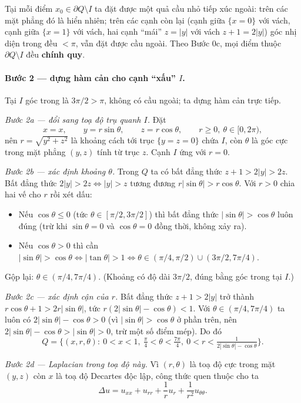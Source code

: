 Tại mỗi điểm $x_0\in\partial Q\setminus I$ ta đặt được một quả cầu nhỏ tiếp xúc ngoài: trên các mặt phẳng đó là hiển nhiên; trên các cạnh còn lại (cạnh giữa $\{x=0\}$ với vách, cạnh giữa $\{x=1\}$ với vách, hai cạnh ``mái'' $z=|y|$ với vách $z+1=2|y|$) góc nhị diện trong đều $<\pi$, vẫn đặt được cầu ngoài. Theo Bước 0c, mọi điểm thuộc $\partial Q\setminus I$ đều \textbf{chính quy}.

\paragraph{Bước 2 --- dựng hàm cản cho cạnh ``xấu'' $I$.}\leavevmode

Tại $I$ góc trong là $3\pi/2>\pi$, không có cầu ngoài; ta dựng hàm cản trực tiếp.

\emph{Bước 2a --- đổi sang toạ độ trụ quanh $I$.} Đặt
\[
  x=x,\qquad y=r\sin\theta,\qquad z=r\cos\theta,\qquad r\ge0,\ \theta\in[0,2\pi),
\]
nên $r=\sqrt{y^2+z^2}$ là khoảng cách tới trục $\{y=z=0\}$ chứa $I$, còn $\theta$ là góc cực trong mặt phẳng $(y,z)$ tính từ trục $z$. Cạnh $I$ ứng với $r=0$.

\emph{Bước 2b --- xác định khoảng $\theta$.} Trong $Q$ ta có bất đẳng thức $z+1>2|y|>2z$. Bất đẳng thức $2|y|>2z\iff|y|>z$ tương đương $r|\sin\theta|>r\cos\theta$. Với $r>0$ chia hai vế cho $r$ rồi xét dấu:
\begin{itemize}
  \item Nếu $\cos\theta\le0$ (tức $\theta\in[\pi/2,3\pi/2]$) thì bất đẳng thức $|\sin\theta|>\cos\theta$ luôn đúng (trừ khi $\sin\theta=0$ và $\cos\theta=0$ đồng thời, không xảy ra).
  \item Nếu $\cos\theta>0$ thì cần $|\sin\theta|>\cos\theta\iff|\tan\theta|>1\iff\theta\in(\pi/4,\pi/2)\cup(3\pi/2,7\pi/4)$.
\end{itemize}
Gộp lại: $\theta\in(\pi/4,7\pi/4)$. (Khoảng có độ dài $3\pi/2$, đúng bằng góc trong tại $I$.)

\emph{Bước 2c --- xác định cận của $r$.} Bất đẳng thức $z+1>2|y|$ trở thành $r\cos\theta+1>2r|\sin\theta|$, tức $r(2|\sin\theta|-\cos\theta)<1$. Với $\theta\in(\pi/4,7\pi/4)$ ta luôn có $2|\sin\theta|-\cos\theta>0$ (vì $|\sin\theta|>\cos\theta$ ở phần trên, nên $2|\sin\theta|-\cos\theta>|\sin\theta|>0$, trừ một số điểm mép). Do đó
\[
  Q=\Big\{(x,r,\theta):\ 0<x<1,\ \tfrac{\pi}{4}<\theta<\tfrac{7\pi}{4},\ 0<r<\tfrac{1}{2|\sin\theta|-\cos\theta}\Big\}.
\]

\emph{Bước 2d --- Laplacian trong toạ độ này.} Vì $(r,\theta)$ là toạ độ cực trong mặt $(y,z)$ còn $x$ là toạ độ Decartes độc lập, công thức quen thuộc cho ta
\[
  \Delta u=u_{xx}+u_{rr}+\frac{1}{r}u_r+\frac{1}{r^2}u_{\theta\theta}.
\]


